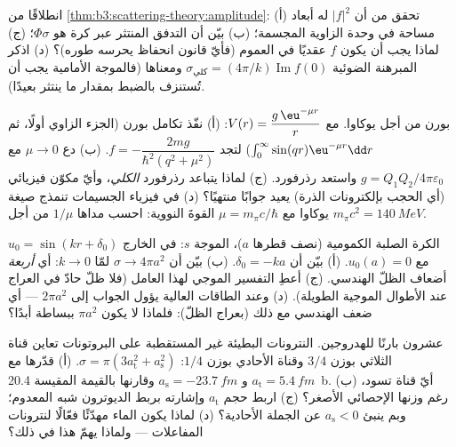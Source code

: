 \begin{exercise}[$\star$]\label{exo:b3:scattering-theory:4}
انطلاقًا من \cref{thm:b3:scattering-theory:amplitude}: (أ) تحقق من أن
$|f|^2$ له أبعاد مساحة في وحدة الزاوية المجسمة؛ (ب) بيّن
أن التدفق المنتثر عبر كرة هو $\Phi\sigma$؛ (ج) لماذا يجب أن يكون
$f$ عقديًا في العموم (فأيّ قانون انحفاظ يحرسه طوره)؟ (د)
اذكر المبرهنة الضوئية $\sigma_{\text{كلي}} =
(4\pi/k)\operatorname{Im}f(0)$ ومعناها (فالموجة الأمامية
يجب أن تُستنزف بالضبط بمقدار ما ينتثر بعيدًا).
\end{exercise}

\begin{exercise}[$\star\star$]\label{exo:b3:scattering-theory:5}
بورن من أجل يوكاوا. مع $V(r) = \dfrac{g\,\eu^{-\mu r}}{r}$: (أ)
نفّذ تكامل بورن (الجزء الزاوي أولًا، ثم $\int_0^
\infty\sin(qr)\eu^{-\mu r}\dd r$) لتجد $f = -\dfrac{2mg}
{\hbar^2(q^2 + \mu^2)}$. (ب) دع $\mu \to 0$ مع $g =
Q_1Q_2/4\pi\varepsilon_0$ واستعد رذرفورد. (ج) لماذا يتباعد
 رذرفورد \emph{الكلي}، وأيّ مكوّن فيزيائي
(أي الحجب بإلكترونات الذرة) يعيد جوابًا منتهيًا؟ (د) في
فيزياء الجسيمات تنمذج صيغة يوكاوا مع $\mu =
m_\pi c/\hbar$ القوةَ النووية: احسب مداها
$1/\mu$ من أجل $m_\pi c^2 = \qty{140}{MeV}$.
\end{exercise}

\begin{exercise}[$\star\star$]\label{exo:b3:scattering-theory:6}
الكرة الصلبة الكمومية (نصف قطرها $a$)، الموجة $s$: في الخارج $u_0 =
\sin(kr + \delta_0)$ مع $u_0(a) = 0$. (أ) بيّن أن $\delta_0 = -ka$.
(ب) بيّن أن $\sigma \to 4\pi a^2$ لمّا $k \to 0$: أي \emph{أربعة}
أضعاف الظلّ الهندسي. (ج) أعطِ التفسير الموجي لهذا العامل
(فلا ظلّ حادّ في العراج عند الأطوال الموجية الطويلة). (د) وعند الطاقات
العالية يؤول الجواب إلى $2\pi a^2$ --- أي ضعف الهندسي مع ذلك
(بعراج الظلّ): فلماذا لا يكون $\pi a^2$ ببساطة أبدًا؟
\end{exercise}

\begin{exercise}[$\star\star$]\label{exo:b3:scattering-theory:7}
عشرون بارنًا للهدروجين. النترونات البطيئة غير المستقطبة على
البروتونات تعاين قناة الثلاثي بوزن $3/4$ وقناة
الأحادي بوزن $1/4$: $\sigma = \pi(3a_{\text{t}}^2 +
a_{\text{s}}^2)$. (أ) قدّرها مع $a_{\text{t}} = \qty{5.4}{fm}$ و
$a_{\text{s}} = \qty{-23.7}{fm}$ وقارنها بالقيمة المقيسة
\qty{20.4}{b}. (ب) أيّ قناة تسود، رغم وزنها الإحصائي
الأصغر؟ (ج) اربط حجم $a_{\text{t}}$ وإشارته
بربط الديوترون شبه المعدوم؛ وبم ينبئ $a_{\text{s}} < 0$
عن الجملة الأحادية؟ (د) لماذا يكون الماء مهدّئًا فعّالًا
لنترونات المفاعلات --- ولماذا يهمّ هذا  في ذلك؟
\end{exercise}

